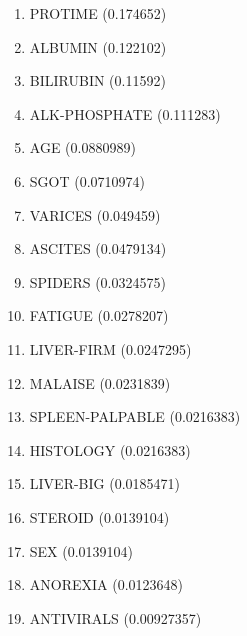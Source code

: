 \begin{enumerate}
\item PROTIME (0.174652)
\item ALBUMIN (0.122102)
\item BILIRUBIN (0.11592)
\item ALK-PHOSPHATE (0.111283)
\item AGE (0.0880989)
\item SGOT (0.0710974)
\item VARICES (0.049459)
\item ASCITES (0.0479134)
\item SPIDERS (0.0324575)
\item FATIGUE (0.0278207)
\item LIVER-FIRM (0.0247295)
\item MALAISE (0.0231839)
\item SPLEEN-PALPABLE (0.0216383)
\item HISTOLOGY (0.0216383)
\item LIVER-BIG (0.0185471)
\item STEROID (0.0139104)
\item SEX (0.0139104)
\item ANOREXIA (0.0123648)
\item ANTIVIRALS (0.00927357)
\end{enumerate}